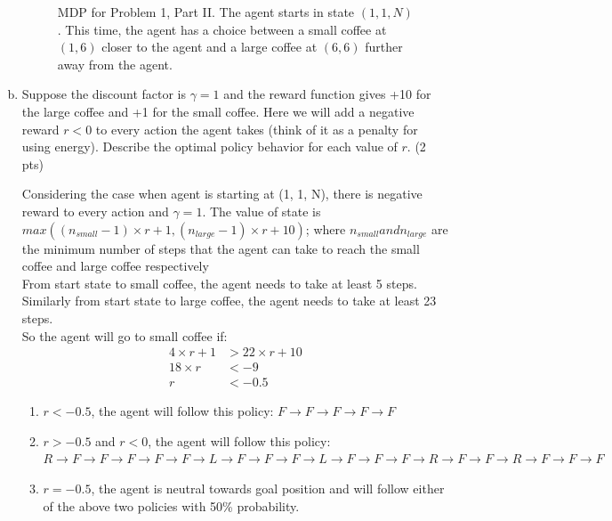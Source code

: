 \documentclass[12pt]{article}
\begin{document}
\begin{enumerate}[a)]
\begin{figure}[h]
  \caption{MDP for Problem 1, Part II. The agent starts in state $(1, 1, N)$. This time, the agent has a choice between a small coffee at $(1,6)$ closer to the agent and a large coffee at $(6,6)$ further away from the agent. \label{fig:1b-mdp}}
\end{figure}
\FloatBarrier

\item Suppose the discount factor is $\gamma = 1$ and the reward function gives +10 for the large coffee and +1 for the small coffee. Here we will add a negative reward $r < 0$ to every action the agent takes (think of it as a penalty for using energy). Describe the optimal policy behavior for each value of $r$. (2 pts)

\begin{solution}
Considering the case when agent is starting at (1, 1, N), there is negative reward to every action and $\gamma = 1$. The value of state is $ max((n_{small}-1) \times r + 1, (n_{large}-1) \times r + 10)$; where $n_{small} and n_{large}$ are the minimum number of steps that the agent can take to reach the small coffee and large coffee respectively\\
From start state to small coffee, the agent needs to take at least 5 steps. Similarly from start state to large coffee, the agent needs to take at least 23 steps.\\
So the agent will go to small coffee if:
\begin{align} 
4\times r + 1 &> 22 \times r + 10 \\
18\times r &< -9\\
r &< -0.5
\end{align}
\begin{enumerate}
\item $r < -0.5$, the agent will follow this policy: $F \rightarrow F \rightarrow F \rightarrow F \rightarrow F$
\item $r > -0.5$ and $r < 0$, the agent will follow this policy: $R \rightarrow F \rightarrow F \rightarrow F \rightarrow F \rightarrow F \rightarrow L \rightarrow F \rightarrow F \rightarrow F \rightarrow L \rightarrow F \rightarrow F \rightarrow F \rightarrow R \rightarrow F \rightarrow F \rightarrow R \rightarrow F \rightarrow F \rightarrow F$
\item  $r = -0.5$, the agent is neutral towards goal position and will follow either of the above two policies with 50\% probability.
\end{enumerate}
\end{solution}


\end{enumerate}
\end{document}
